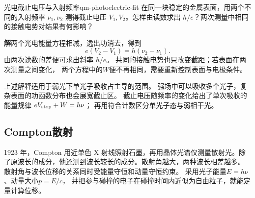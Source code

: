 \begin{example}{光电截止电压与入射频率}{qm-photoelectric-fit}
    在同一块稳定的金属表面，用两个不同的入射频率 $\nu_1,\nu_2$ 测得截止电压 $V_1,V_2$。怎样由读数求出 $h/e$？两次测量中相同的接触电势对结果有何影响？

    \par\smallskip\textbf{解}\quad 两个光电能量方程相减，逸出功消去，得到
    \begin{equation}
        e(V_2 - V_1) = h(\nu_2 - \nu_1).
    \end{equation}
    由两次读数的差便可求出斜率 $h/e$。
    共同的接触电势也只改变截距；若表面在两次测量之间变化，
    两个方程中的$W$便不再相同，需要重新控制表面与电极条件。
\end{example}

上述解释适用于弱光下单光子吸收占主导的范围。
强场中可以吸收多个光子，复杂表面的功函数分布也会展宽截止区。
截止电压随频率的变化给出了单次吸收的能量规律 $eV_{\mathrm{stop}} + W = h\nu$；
再用符合计数区分单光子态与弱相干光。

\subsection{Compton散射}
\label{ss:compton}

1923 年，Compton 用近单色 X 射线照射石墨，再用晶体光谱仪测量散射光。除了原波长的成分，他还测到波长较长的成分。散射角越大，两种波长相差越多\cite{compton}。
散射角与波长位移的关系同时受能量守恒和动量守恒约束。
采用光子能量$E = h\nu$、动量大小$p = E/c$，
并把参与碰撞的电子在碰撞时间内近似为自由粒子，就能定量计算位移。

